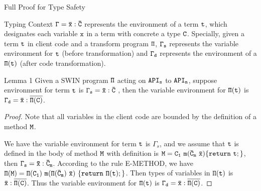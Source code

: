 \begin{section}{Full Proof for Type Safety}\label{sec:proof}

\begin{definition}{Typing Context} $\tt\Gamma=\bar{x}:\bar{C}$ represents the environment of a term $\tt t$, which designates each variable $\tt x$ in a term with concrete a type $\tt C$.  Specially, given a term $\tt t$ in client code and a transform program $\tt\Pi$, $\tt\Gamma_s$ represents the variable environment for $\tt t$ (before transformation) and $\tt\Gamma_d$ represents the environment of a $\tt\Pi(t)$ (after code transformation).
\end{definition}

\begin{lemma}{Lemma 1}
Given a SWIN program $\tt\Pi$ acting on $\tt API_s$ to $\tt API_n$, suppose environment for term $\tt t$ is $\tt\Gamma_s = \bar{x}:\bar{C}$ , then the variable environment for $\tt\Pi(t)$ is $\tt\Gamma_d=\bar{x}:\overline{\Pi(C)}$.
\end{lemma}
\begin{proof}
Note that all variables in the client code are bounded by the definition of a method $\tt M$. 
\par
We have the variable environment for term $\tt t$ is $\Gamma_s$, and we assume that $\tt t$ is defined in the body of method $\tt M$ with definition is $\tt M=C_1\ m(\bar{C}_m\ \bar{x})\{return\ t;\}$, 
then $\tt\Gamma_s = \bar{x}:\bar{C}_m$. According to the rule E-METHOD, we have $\tt\Pi(M)=\Pi(C_1)\ m(\Pi(\bar{C}_m)\ \bar{x})\ \{return\ \Pi(t);\}$. Then types of variables in $\tt \Pi(t)$ is $\tt\bar{x}:\overline{\Pi(C)}$. Thus the variable environment for $\tt\Pi(t)$ is $\tt\Gamma_d=\bar{x}:\overline{\Pi(C)}$.
\end{proof}


\end{section}
